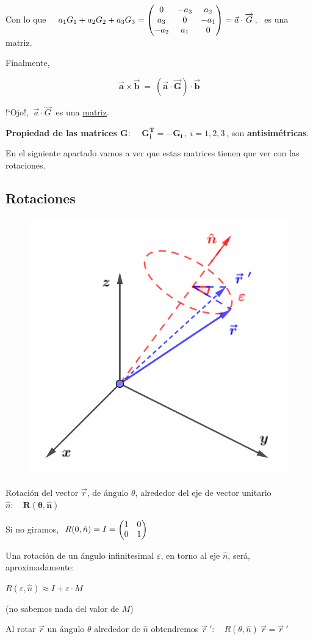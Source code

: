 Con lo que $\quad a_1G_1+a_2G_2+a_3G_3=\mqty(0&-a_3&a_2\\a_3&0&-a_1\\-a_2&a_1&0) = \vec a \cdot \overrightarrow G\, , \ $  es una matriz.

\vspace{5mm} 
Finalmente,

\begin{equation}
\label{T16OFEPV}
\boxed{ \ \boldsymbol{
\vec a \times \vec b \ = \ (\vec a \cdot \overrightarrow G) \cdot \vec b
} \ }	
\end{equation}


!`Ojo!, $\ \vec a \cdot \overrightarrow G\ $ es una \underline{matriz}.

\vspace{5mm}
\textbf{Propiedad de las matrices G}: $\quad \boldsymbol{G_i^T=-G_i}\, , \  i=1,2,3\ $, son \textbf{antisimétricas}.

En el siguiente apartado vamos a ver que estas matrices tienen que ver con las rotaciones.

\vspace{5mm}
\subsection{Rotaciones}
\vspace{5mm}

\begin{multicols}{2}
	\begin{figure}[H]
	\centering
	\includegraphics[width=.35\textwidth]{imagenes/img16-01.png}
\end{figure}
Rotación del vector $\vec r$, de ángulo $\theta$, alrededor del eje de vector unitario $\hat n:\quad \boldsymbol{R(\theta,\hat n)}$

Si no giramos, $\ R(0,\hat n)=I=\mqty(\imat{2})$

Una rotación de un ángulo infinitesimal $\varepsilon$, en torno al eje $\hat n$, será, aproximadamente:

 $R(\varepsilon, \hat n)\approx I+\varepsilon\cdot M$ \begin{footnotesize} (no sabemos nada del valor de $M$) \end{footnotesize}
 
 Al rotar $\vec r$ un ángulo $\theta$ alrededor de $\hat n$ obtendremos $\vec r\ ':\quad R(\theta , \hat n) \ \vec r = \vec r\ ' $

\end{multicols}


